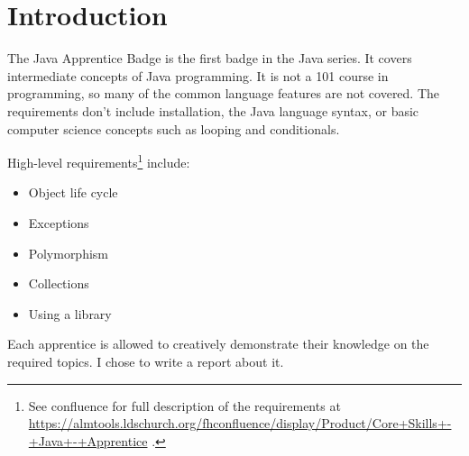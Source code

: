 \section*{Introduction} %


The Java Apprentice Badge is the first badge in the Java series. It covers intermediate concepts of Java programming. It is not a 101 course in programming, so many of the common language features are not covered. The requirements don't include installation, the Java language syntax, or basic computer science concepts such as looping and conditionals.

High-level requirements\footnote{See confluence for full description of the requirements at \url{https://almtools.ldschurch.org/fhconfluence/display/Product/Core+Skills+-+Java+-+Apprentice} .} include:
\begin{itemize}
\item Object life cycle
\item Exceptions
\item Polymorphism
\item Collections
\item Using a library
\end{itemize}

Each apprentice is allowed to creatively demonstrate their knowledge on the required topics. I chose to write a report about it.